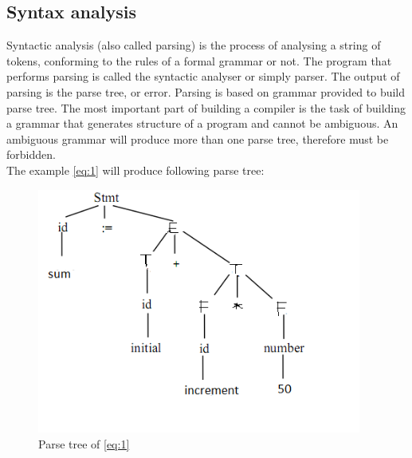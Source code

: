 \documentclass[12pt, a4paper]{report}
\begin{document}
			\subsection{Syntax analysis}
				\tab Syntactic analysis (also called parsing) is the process of analysing a string of tokens, conforming to the rules of a formal grammar or not. The program that performs parsing is called the syntactic analyser or simply parser. The output of parsing is the parse tree, or error. Parsing is based on grammar provided to build parse tree.
The most important part of building a compiler is the task of building a grammar that generates structure of a program and cannot be ambiguous. An ambiguous grammar will produce more than one parse tree, therefore must be forbidden. \\
The example \ref{eq:1} will produce following parse tree:
				\begin{figure}[h]
					\centering
					\includegraphics[width=0.95\textwidth]{pt.png}
					\caption{Parse tree of \ref{eq:1}}
					\label{fig:parseTree}
				\end{figure}
			\newpage
\end{document}

